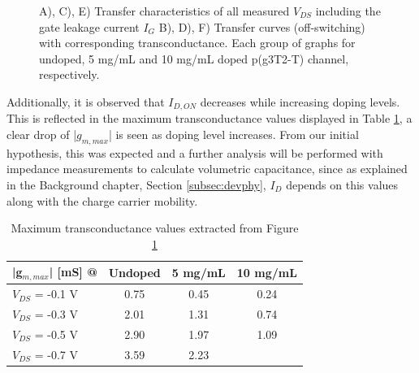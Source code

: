 \begin{figure}[ht]
    \caption[Transfer characteristics and transconductance at different doping levels and $V_{DS}$]{A), C), E) Transfer characteristics of all measured $V_{DS}$ including the gate leakage current $I_{G}$ B), D), F) Transfer curves (off-switching) with corresponding transconductance. Each group of graphs for undoped, 5 mg/mL and 10 mg/mL doped p(g3T2-T) channel, respectively.}
    \label{fig:transx2}
\end{figure}


Additionally, it is observed that $I_{D,ON}$ decreases while increasing doping levels. This is reflected in the maximum transconductance values displayed in Table \ref{tab:trans}, a clear drop of |$g_{m,max}$| is seen as doping level increases. From our initial hypothesis, this was expected and a further analysis will be performed with impedance measurements to calculate volumetric capacitance, since as explained in the Background chapter, Section \ref{subsec:devphy}, $I_{D}$ depends on this values along with the charge carrier mobility.


\begin{table}[ht]
\centering
\caption{Maximum transconductance values extracted from Figure \ref{fig:transx2}}
\begin{tabular}{l|c|c|c}
|g$_{m,max}$| [mS] @ & Undoped & 5 mg/mL & 10 mg/mL \\\hline
$V_{DS}$ = -0.1 V & 0.75 & 0.45 & 0.24\\
$V_{DS}$ = -0.3 V & 2.01 & 1.31 & 0.74\\
$V_{DS}$ = -0.5 V & 2.90 & 1.97 & 1.09\\
$V_{DS}$ = -0.7 V & 3.59 & 2.23 & \\ \hline
\end{tabular}
\label{tab:trans}
\end{table}

